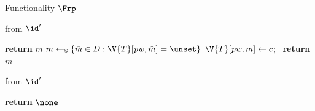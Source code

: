 \begin{interface}[nofloat]{Functionality $\Frp$ \\
}
{\begin{multicols}{2}
 \quad from $\id'$
\begin{algorithmic}[1]
\algcont
{}
  \State \textbf{return} $m$ \label{ln:rpconsistent}
\EndIf
\State $m \gets_{\$} \{\hat{m} \in D : \V{T}[\mathit{pw}, \hat{m}] = \unset\}$ \label{ln:rpinverse}
\State $\V{T}[\mathit{pw}, m] \gets c$; \ \textbf{return} $m$
\algsave
\end{algorithmic}
\vspace{1.4ex}

 \quad from $\id'$
\begin{algorithmic}[1]
\algcont
\State \textbf{return} $\none$ \label{ln:rpnoleak}
\algsave
\end{algorithmic}
\end{multicols}}
\end{interface}
